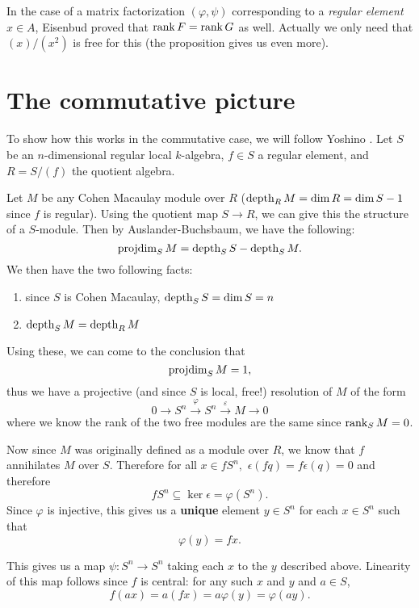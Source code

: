 \documentclass [11pt, proquest] {uwthesis}[2020/02/24]
\begin{document}
\begin{rmk}
    In the case of a matrix factorization $(\varphi,\psi)$ corresponding to a \textit{regular element} $x\in A$, Eisenbud proved \cite[Prop. 5.5]{eisenbud80} that $\operatorname{rank} F=\operatorname{rank} G$ as well. Actually we only need that $(x)/(x^2)$ is free for this (the proposition gives us even more).
\end{rmk} 

\section{The commutative picture}
    To show how this works in the commutative case, we will follow Yoshino \cite{yoshino90}. Let $S$ be an $n$-dimensional regular local $k$-algebra, $f\in S$ a regular element, and $R=S/(f)$ the quotient algebra.
    
    Let $M$ be any Cohen Macaulay module over $R$ ($\operatorname{depth}_{R} M=\dim R=\dim S - 1$ since $f$ is regular). Using the quotient map $S\to R$, we can give this the structure of a $S$-module. Then by Auslander-Buchsbaum, we have the following:
    \[\operatorname{projdim}_{S} M=\operatorname{depth}_{S} S - \operatorname{depth}_{S} M.\]
    We then have the two following facts:
    \begin{enumerate}
        \item since $S$ is Cohen Macaulay, $\operatorname{depth}_{S} S=\dim S=n$
        \item $\operatorname{depth}_S M=\operatorname{depth}_{R} M$
    \end{enumerate}
    
    Using these, we can come to the conclusion that
    \[\operatorname{projdim}_{S} M = 1,\]
    thus we have a projective (and since $S$ is local, free!) resolution of $M$ of the form
    \[0\to S^n\xrightarrow{\varphi} S^n\xrightarrow{\varepsilon} M\to 0\]
    where we know the rank of the two free modules are the same since $\operatorname{rank}_SM=0$.
    
    Now since $M$ was originally defined as a module over $R$, we know that $f$ annihilates $M$ over $S$. Therefore for all $x\in fS^n,$ $\epsilon(fq)=f\epsilon(q)=0$
    and therefore
    \[f S^n\subseteq \ker\epsilon=\varphi(S^n).\]
    Since $\varphi$ is injective, this gives us a \textbf{unique} element $y\in S^n$ for each $x\in S^n$ such that 
    \[\varphi(y)=fx.\]
    
    This gives us a map $\psi:S^n\to S^n$ taking each $x$ to the $y$ described above. Linearity of this map follows since $f$ is central: for any such $x$ and $y$ and $a\in S$,
    \[f(ax)=a(fx)=a\varphi(y)=\varphi(ay).\]
    
\end{document}
